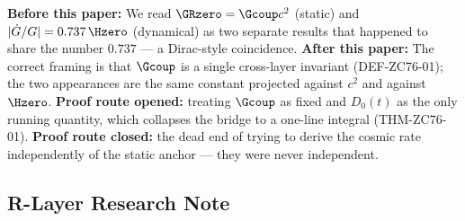 \documentclass[12pt, a4paper]{article}
\begin{document}
\begin{derivedbox}[title={Reframe: ``two matching numbers''
  $\to$ ``one invariant, two faces''}]
\textbf{Before this paper:} We read $\GRzero = \Gcoup c^2$ (static) and
$|\dot{G}/G| = 0.737\,\Hzero$ (dynamical) as two separate results that
happened to share the number $0.737$ --- a Dirac-style coincidence.
\textbf{After this paper:} The correct framing is that $\Gcoup$ is a
single cross-layer invariant (DEF-ZC76-01); the two appearances are the
same constant projected against $c^2$ and against $\Hzero$.
\textbf{Proof route opened:} treating $\Gcoup$ as fixed and $D_0(t)$ as
the only running quantity, which collapses the bridge to a one-line
integral (THM-ZC76-01).
\textbf{Proof route closed:} the dead end of trying to derive the cosmic
rate independently of the static anchor --- they were never independent.
\end{derivedbox}

\subsection{R-Layer Research Note}
\label{sec:rlayer}
\end{document}
